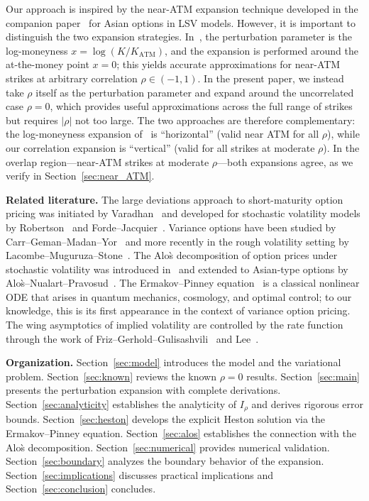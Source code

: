 \documentclass[11pt]{article}
\theoremstyle{definition}
\begin{document}
Our approach is inspired by the near-ATM expansion technique developed in the companion paper~\cite{PZ2025} for Asian options in LSV models. However, it is important to distinguish the two expansion strategies. In~\cite{PZ2025}, the perturbation parameter is the log-moneyness $x = \log(K/K_{\mathrm{ATM}})$, and the expansion is performed around the at-the-money point $x = 0$; this yields accurate approximations for near-ATM strikes at arbitrary correlation $\rho \in (-1,1)$. In the present paper, we instead take $\rho$ itself as the perturbation parameter and expand around the uncorrelated case $\rho = 0$, which provides useful approximations across the full range of strikes but requires $|\rho|$ not too large. The two approaches are therefore complementary: the log-moneyness expansion of~\cite{PZ2025} is ``horizontal'' (valid near ATM for all $\rho$), while our correlation expansion is ``vertical'' (valid for all strikes at moderate $\rho$). In the overlap region---near-ATM strikes at moderate $\rho$---both expansions agree, as we verify in Section~\ref{sec:near_ATM}.

\medskip
\noindent\textbf{Related literature.}
The large deviations approach to short-maturity option pricing was initiated by Varadhan~\cite{Varadhan1967} and developed for stochastic volatility models by Robertson~\cite{Robertson2010} and Forde--Jacquier~\cite{FordeJacquier2011}. Variance options have been studied by Carr--Geman--Madan--Yor~\cite{CGMY2005} and more recently in the rough volatility setting by Lacombe--Muguruza--Stone~\cite{LMS2021}. The Alo\`s decomposition of option prices under stochastic volatility was introduced in~\cite{Alos2006,Alos2012} and extended to Asian-type options by Alo\`s--Nualart--Pravosud~\cite{Alos2024}. The Ermakov--Pinney equation~\cite{Ermakov1880,Pinney1950} is a classical nonlinear ODE that arises in quantum mechanics, cosmology, and optimal control; to our knowledge, this is its first appearance in the context of variance option pricing. The wing asymptotics of implied volatility are controlled by the rate function through the work of Friz--Gerhold--Gulisashvili~\cite{FGG2015} and Lee~\cite{Lee2004}.

\medskip
\noindent\textbf{Organization.}
Section~\ref{sec:model} introduces the model and the variational problem. Section~\ref{sec:known} reviews the known $\rho=0$ results. Section~\ref{sec:main} presents the perturbation expansion with complete derivations. Section~\ref{sec:analyticity} establishes the analyticity of $I_\rho$ and derives rigorous error bounds. Section~\ref{sec:heston} develops the explicit Heston solution via the Ermakov--Pinney equation. Section~\ref{sec:alos} establishes the connection with the Alo\`s decomposition. Section~\ref{sec:numerical} provides numerical validation. Section~\ref{sec:boundary} analyzes the boundary behavior of the expansion. Section~\ref{sec:implications} discusses practical implications and Section~\ref{sec:conclusion} concludes.
\end{document}

